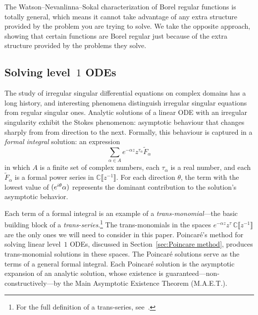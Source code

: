 \documentclass{article}
\let\Re\relax
\DeclareMathOperator{\Re}{Re}
\newcommand{\C}{\mathbb{C}}
\newcommand{\series}[1]{\tilde{#1}}
\theoremstyle{definition}
\theoremstyle{plain}
\begin{document}
The Watson--Nevanlinna--Sokal characterization of Borel regular functions is totally general, which means it cannot  take advantage of any extra structure provided by the problem you are trying to solve. We take the opposite approach, showing that certain functions are Borel regular just because of the extra structure provided by the problems they solve. 
%
\subsection{Solving level~$1$ ODEs}\label{sec:history_ODE}
%
The study of irregular singular differential equations on complex domains has a long history, and interesting phenomena distinguish irregular singular equations from regular singular ones. Analytic solutions of a linear ODE with an irregular singularity exhibit the Stokes phenomenon: asymptotic behaviour that changes sharply from from direction to the next. Formally, this behaviour is captured in a {\em formal integral} solution: an expression
\[ \sum_{\alpha \in A} e^{-\alpha z} z^{\tau_\alpha} \series{F}_\alpha \]
in which $A$ is a finite set of complex numbers, each $\tau_\alpha$ is a real number, and each $\series{F}_\alpha$ is a formal power series in $\C\llbracket z^{-1} \rrbracket$. For each direction $\theta$, the term with the lowest value of $\Re(e^{i\theta} \alpha)$ represents the dominant contribution to the solution's asymptotic behavior.

Each term of a formal integral is an example of a {\em trans-monomial}---the basic building block of a {\em trans-series}.\footnote{For the full definition of a trans-series, see~\cite{EcalleIII,van-der-hoeven2001complex,costin_transseries,costin_summability}.} The trans-monomials in the spaces $e^{-\alpha z} z^\tau\,\C\llbracket z^{-1} \rrbracket$ are the only ones we will need to consider in this paper. Poincar\'{e}'s method for solving linear level~$1$ ODEs, discussed in Section~\ref{sec:Poincare method}, produces trans-monomial solutions in these spaces. The Poincar\'{e} solutions serve as the terms of a general formal integral. Each Poincar\'{e} solution is the asymptotic expansion of an analytic solution, whose existence is guaranteed---non-constructively---by the Main Asymptotic Existence Theorem (M.A.E.T.).
\end{document}
